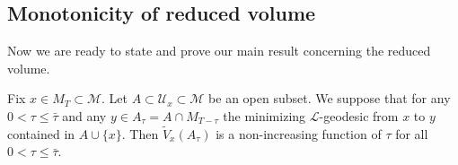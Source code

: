 \subsection{Monotonicity of reduced volume}

Now we are ready to state and prove our main result concerning the
reduced volume.




\begin{theorem}\label{thm:reduced-volume-monotone}
\label{Amono}
Fix $x\in M_T\subset {\mathcal M}$. Let $A\subset{\mathcal
U}_x\subset {\mathcal M}$ be an open  subset. We suppose that for
any $0<\tau\le \bar\tau$ and any $y\in A_\tau=A\cap M_{T-\tau}$ the
minimizing ${\mathcal L}$-geodesic from $x$ to $y$ contained in
$A\cup \{x\}$.  Then $\widetilde V_x(A_\tau)$ is a non-increasing
function of $\tau$ for all $0<\tau\le \bar\tau$.
\end{theorem}





